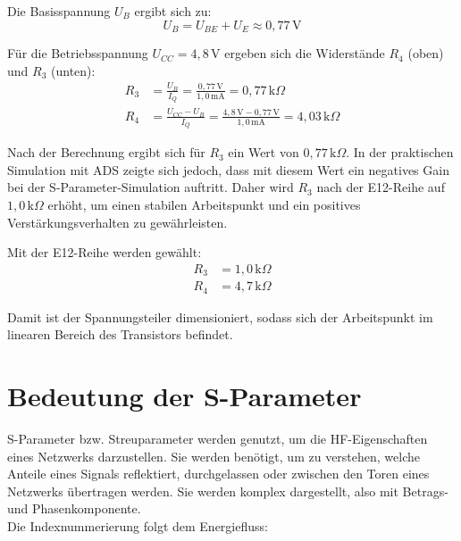  Die Basisspannung $U_B$ ergibt sich zu:
 \begin{equation}
     U_B = U_{BE} + U_E \approx 0{,}77\,\mathrm{V}
 \end{equation}

 Für die Betriebsspannung $U_{CC} = 4{,}8\,\mathrm{V}$ ergeben sich die Widerstände $R_4$ (oben) und $R_3$ (unten):
 \begin{align}
     R_3 &= \frac{U_B}{I_Q} = \frac{0{,}77\,\mathrm{V}}{1{,}0\,\mathrm{mA}} = 0{,}77\,\mathrm{k}\Omega \\
     R_4 &= \frac{U_{CC} - U_B}{I_Q} = \frac{4{,}8\,\mathrm{V} - 0{,}77\,\mathrm{V}}{1{,}0\,\mathrm{mA}} = 4{,}03\,\mathrm{k}\Omega
 \end{align}

 Nach der Berechnung ergibt sich für $R_3$ ein Wert von $0{,}77\,\mathrm{k}\Omega$. In der praktischen Simulation mit ADS zeigte sich jedoch, dass mit diesem Wert ein negatives Gain bei der S-Parameter-Simulation auftritt. Daher wird $R_3$ nach der E12-Reihe auf $1{,}0\,\mathrm{k}\Omega$ erhöht, um einen stabilen Arbeitspunkt und ein positives Verstärkungsverhalten zu gewährleisten.

 Mit der E12-Reihe werden gewählt:
 \begin{align*}
     R_3 &= 1{,}0\,\mathrm{k}\Omega \\
     R_4 &= 4{,}7\,\mathrm{k}\Omega
 \end{align*}

 Damit ist der Spannungsteiler dimensioniert, sodass sich der Arbeitspunkt im linearen Bereich des Transistors befindet.

\section{Bedeutung der S-Parameter}
S-Parameter bzw. Streuparameter werden genutzt, um die HF-Eigenschaften eines
Netzwerks darzustellen. Sie werden benötigt, um zu verstehen, welche Anteile eines Signals
reflektiert, durchgelassen oder zwischen den Toren eines Netzwerks übertragen werden.
Sie werden komplex dargestellt, also mit Betrags- und Phasenkomponente.
\\
Die Indexnummerierung folgt dem Energiefluss:


